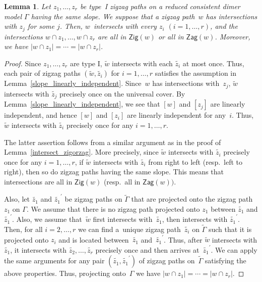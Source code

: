 \documentclass[pdftex]{sigma}%
\numberwithin{equation}{section}
\numberwithin{figure}{section}
\numberwithin{table}{section}
\newtheorem{Lemma}[Theorem]{Lemma}
\newcommand{\Zig}{\mathsf{Zig}}
\newcommand{\Zag}{\mathsf{Zag}}
\begin{document}
\begin{Lemma}\label{intersect_zigorzag2}
Let $z_1,\dots,z_r$ be type~I zigzag paths on a reduced consistent dimer model $\Gamma$ having the same slope.
We suppose that a zigzag path~$w$ has intersections with $z_j$ for some $j$.
Then, $w$~intersects with every $z_i$ $(i=1,\dots,r)$, and the intersections $w\cap z_1,\dots, w\cap z_r$ are all in $\Zig(w)$ or all in $\Zag(w)$.
Moreover, we have $|w\cap z_1|=\cdots=|w\cap z_r|$.
\end{Lemma}

\begin{proof}
Since $z_1,\dots,z_r$ are type I, $\widetilde{w}$ intersects with each $\widetilde{z_i}$ at most once.
Thus, each pair of zigzag paths $(\widetilde{w},\widetilde{z_i})$ for $i=1,\dots,r$ satisfies the assumption in Lemma~\ref{slope_linearly_independent}.
Since~$w$ has intersections with~$z_j$, $\widetilde{w}$ intersects with $\widetilde{z_j}$ precisely once on the universal cover.
By Lemma~\ref{slope_linearly_independent}, we see that $[w]$ and $[z_j]$ are linearly independent, and hence $[w]$ and $[z_i]$ are linearly independent for any~$i$.
Thus, $\widetilde{w}$ intersects with $\widetilde{z_i}$ precisely once for any $i=1,\dots,r$.

The latter assertion follows from a similar argument as in the proof of Lemma~\ref{intersect_zigorzag}.
More precisely, since $\widetilde{w}$ intersects with $\widetilde{z_i}$ precisely once for any $i=1,\dots,r$,
if $\widetilde{w}$ intersects with $\widetilde{z_i}$ from right to left (resp.\ left to right), then so do zigzag paths having the same slope.
This means that intersections are all in $\Zig(w)$ (resp.\ all in $\Zag(w))$.

Also, let $\widetilde{z_1}$ and $\widetilde{z_1}^\prime$ be zigzag paths on $\widetilde{\Gamma}$ that are projected onto the zigzag path $z_1$ on $\Gamma$.
We assume that there is no zigzag path projected onto $z_1$ between $\widetilde{z_1}$ and $\widetilde{z_1}^\prime$.
Also, we assume that~$\widetilde{w}$ first intersects with~$\widetilde{z_1}$, then intersects with $\widetilde{z_1}^\prime$.
Then, for all $i=2,\dots,r$ we can find a~unique zigzag path~$\widetilde{z_i}$ on $\widetilde{\Gamma}$ such that it is projected onto $z_i$ and is located between~$\widetilde{z_1}$ and~$\widetilde{z_1}^\prime$.
Thus, after $\widetilde{w}$ intersects with $\widetilde{z_1}$, it intersects with $\widetilde{z_2}, \dots, \widetilde{z_r}$ precisely once and then arrives at~$\widetilde{z_1}^\prime$.
We can apply the same arguments for any pair $(\widetilde{z_1},\widetilde{z_1}^\prime)$ of zigzag paths on~$\widetilde{\Gamma}$ satisfying the above properties. Thus, projecting onto~$\Gamma$ we have $|w\cap z_1|=\cdots=|w\cap z_r|$.
\end{proof}
\end{document}
